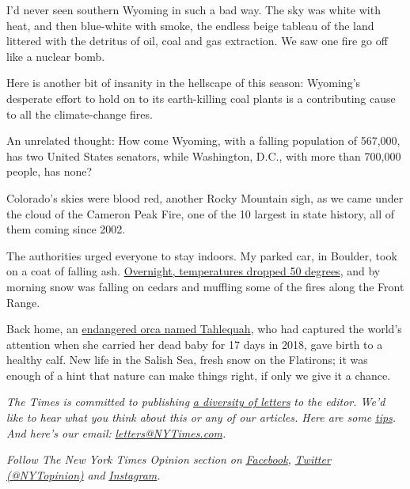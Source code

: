 I'd never seen southern Wyoming in such a bad way. The sky was white
with heat, and then blue-white with smoke, the endless beige tableau of
the land littered with the detritus of oil, coal and gas extraction. We
saw one fire go off like a nuclear bomb.

Here is another bit of insanity in the hellscape of this season:
Wyoming's desperate effort to hold on to its earth-killing coal plants
is a contributing cause to all the climate-change fires.

An unrelated thought: How come Wyoming, with a falling population of
567,000, has two United States senators, while Washington, D.C., with
more than 700,000 people, has none?

Colorado's skies were blood red, another Rocky Mountain sigh, as we came
under the cloud of the Cameron Peak Fire, one of the 10 largest in state
history, all of them coming since 2002.

The authorities urged everyone to stay indoors. My parked car, in
Boulder, took on a coat of falling ash.
\href{https://www.nytimes3xbfgragh.onion/2020/09/08/us/denver-snow-weather.html}{Overnight,
temperatures dropped 50 degrees}, and by morning snow was falling on
cedars and muffling some of the fires along the Front Range.

Back home, an
\href{https://www.seattletimes.com/seattle-news/environment/orca-tahlequah-is-a-mother-again/}{endangered
orca named Tahlequah}, who had captured the world's attention when she
carried her dead baby for 17 days in 2018, gave birth to a healthy calf.
New life in the Salish Sea, fresh snow on the Flatirons; it was enough
of a hint that nature can make things right, if only we give it a
chance.

\emph{The Times is committed to publishing}
\href{https://www.nytimes3xbfgragh.onion/2019/01/31/opinion/letters/letters-to-editor-new-york-times-women.html}{\emph{a
diversity of letters}} \emph{to the editor. We'd like to hear what you
think about this or any of our articles. Here are some}
\href{https://help.nytimes3xbfgragh.onion/hc/en-us/articles/115014925288-How-to-submit-a-letter-to-the-editor}{\emph{tips}}\emph{.
And here's our email:}
\href{mailto:letters@NYTimes.com}{\emph{letters@NYTimes.com}}\emph{.}

\emph{Follow The New York Times Opinion section on}
\href{https://www.facebookcorewwwi.onion/nytopinion}{\emph{Facebook}}\emph{,}
\href{http://twitter.com/NYTOpinion}{\emph{Twitter (@NYTopinion)}}
\emph{and}
\href{https://www.instagram.com/nytopinion/}{\emph{Instagram}}\emph{.}

